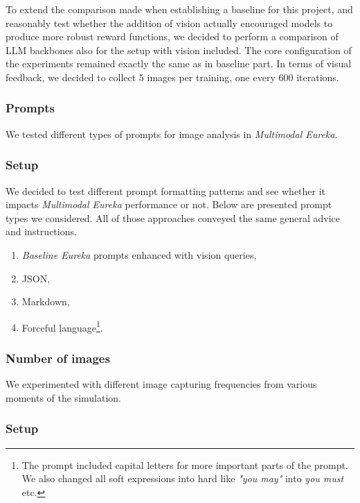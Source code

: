 \documentclass[10pt,twocolumn]{article}
\begin{document}
To extend the comparison made when establishing a baseline for this project, and reasonably test whether the addition of vision actually encouraged models to produce more robust reward functions,  we decided to perform a comparison of LLM backbones also for the setup with vision included. The core configuration of the experiments remained exactly the same as in baseline part. In terms of visual feedback, we decided to collect 5 images per training, one every 600 iterations.

\subsubsection{Prompts}

We tested different types of prompts for image analysis in \textit{Multimodal Eureka}.

\subsubsection*{Setup}

We decided to test different prompt formatting patterns and see whether it impacts \textit{Multimodal Eureka} performance or not. Below are presented prompt types we considered. All of those approaches conveyed the same general advice and instructions.

\begin{enumerate}
    \item \textit{Baseline Eureka} prompts enhanced with vision queries,
    \item JSON,
    \item Markdown,
    \item Forceful language\footnote{The prompt included capital letters for more important parts of the prompt. We also changed all soft expressions into hard like \textit{"you may"} into \textit{you must} etc.}.
\end{enumerate}

\subsubsection{Number of images}

We experimented with different image capturing frequencies from various moments of the simulation.

\subsubsection*{Setup}
\end{document}
